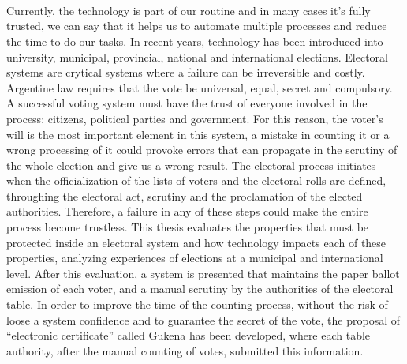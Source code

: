 \ \\
\ \\
\label{pagsumm}
\\
\ \\
\ \\

\ \\

\ \\
\ \\

Currently, the technology is part of our routine and in many cases it's fully trusted, we can say that it helps us to automate multiple processes and reduce the time to do our tasks. In recent years, technology has been introduced into university, municipal, provincial, national and international elections. Electoral systems are crytical systems where a failure can be irreversible and costly. Argentine law requires that the vote be universal, equal, secret and compulsory. A successful voting system must have the trust of everyone involved in the process: citizens, political parties and government. For this reason, the voter's will is the most important element in this system, a mistake in counting it or a wrong processing of it could provoke errors that can propagate in the scrutiny of the whole election and give us a wrong result.\newline
The electoral process initiates when the officialization of the lists of voters and the electoral rolls are defined, throughing the electoral act, scrutiny and the proclamation of the elected authorities. Therefore, a failure in any of these steps could make the entire process become trustless.\newline
This thesis evaluates the properties that must be protected inside an electoral system and how technology impacts each of these properties, analyzing experiences of elections at a municipal and international level. After this evaluation, a system is presented that maintains the paper ballot emission of each voter, and a manual scrutiny by the authorities of the electoral table. In order to improve the time of the counting process, without the risk of loose a system confidence and to guarantee the secret of the vote, the proposal of ``electronic certificate'' called Gukena has been developed, where each table authority, after the manual counting of votes, submitted this information.\newline
